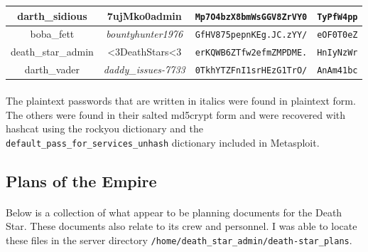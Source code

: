 \documentclass{article}
\begin{document}
\begin{adjustwidth}{-1.5cm}{}
\begin{tabular}{ |c|c|c|c| }
\hline
darth\_sidious & 7ujMko0admin & \texttt{Mp7O4bzX8bmWsGGV8ZrVY0} & \texttt{TyPfW4pp} \\
\hline
boba\_fett & \emph{bountyhunter1976} & \texttt{GfHV875pepnKEg.JC.zYY/} & \texttt{eOF0T0eZ} \\
\hline
death\_star\_admin & \textless 3DeathStars\textless 3 & \texttt{erKQWB6ZTfw2efmZMPDME.} & \texttt{HnIyNzWr} \\
\hline
darth\_vader & \emph{daddy\_issues-7733} & \texttt{0TkhYTZFnI1srHEzG1TrO/} & \texttt{AnAm41bc} \\
\hline
\end{tabular}
\end{adjustwidth}

\paragraph{}
The plaintext passwords that are written in italics were found in plaintext form.
The others were found in their salted md5crypt form and were recovered with hashcat using the rockyou dictionary and the \texttt{default\_pass\_for\_services\_unhash} dictionary included in Metasploit.

\newpage

\subsection{Plans of the Empire}
\paragraph{}
Below is a collection of what appear to be planning documents for the Death Star. These documents also relate to its crew and personnel. I was able to locate these files in the server directory \texttt{/home/death\_star\_admin/death-star\_plans}.
\end{document}
